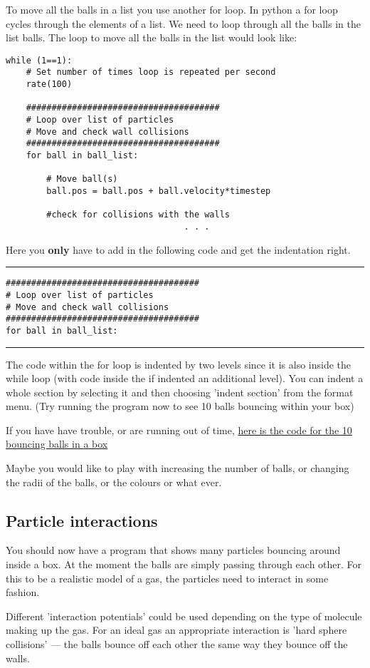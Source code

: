 \documentclass[12pt]{article}
\begin{document}
To move all the balls in a list you use another  {\color{code}for} loop.
In python a {\color{code}for} loop cycles through the elements of a list.
We need to loop through all the balls in the list {\color{code}balls}.
The loop to move all the balls in the list would look like:
{\color{code}\begin{verbatim}
while (1==1):
    # Set number of times loop is repeated per second
    rate(100)

    ######################################
    # Loop over list of particles
    # Move and check wall collisions
    ######################################
    for ball in ball_list:

        # Move ball(s)
        ball.pos = ball.pos + ball.velocity*timestep

        #check for collisions with the walls
                                   . . .
\end{verbatim}}
Here you \textbf{only} have to add in the following code and get the indentation right.
{\color{code}\hrule\begin{verbatim}
######################################
# Loop over list of particles
# Move and check wall collisions
######################################
for ball in ball_list:
\end{verbatim}\hrule}

The code within the for loop is indented by two levels
since it is also inside the while loop (with code inside the if indented an additional level).
You can indent a whole section by selecting it and then choosing 'indent section' from the format menu.
(Try running the program now to see 10 balls bouncing within your box)

If you have have trouble, or are running out of time,
\href{manybounce0.html}{here is the code for the 10 bouncing balls in a box}

Maybe you would like to play with increasing the number of balls, or changing the radii of the balls, or the colours or what ever.

\subsection{Particle interactions}
You should now have a program that shows many particles bouncing around inside a box.
At the moment the balls are simply passing through each other.
For this to be a realistic model of a gas, the particles need to interact in some fashion.

Different 'interaction potentials' could be used depending on the type of molecule making up
the gas.
For an ideal gas an appropriate interaction is 'hard sphere collisions'
--- the balls bounce off each other the same way they bounce off the walls.
\end{document}
